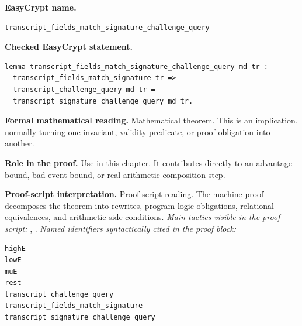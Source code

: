 \begin{formaltheorem}
\noindent\textbf{EasyCrypt name.}
\begin{lstlisting}[language=EasyCrypt,basicstyle=\ttfamily\scriptsize]
transcript_fields_match_signature_challenge_query
\end{lstlisting}
\noindent\textbf{Checked EasyCrypt statement.}
\begin{lstlisting}[language=EasyCrypt,basicstyle=\ttfamily\scriptsize]
lemma transcript_fields_match_signature_challenge_query md tr :
  transcript_fields_match_signature tr =>
  transcript_challenge_query md tr =
  transcript_signature_challenge_query md tr.
\end{lstlisting}
\noindent\textbf{Formal mathematical reading.}
Mathematical theorem. This is an implication, normally turning one invariant, validity predicate, or proof obligation into another.

\noindent\textbf{Role in the proof.}
Use in this chapter. It contributes directly to an advantage bound, bad-event bound, or real-arithmetic composition step.

\noindent\textbf{Proof-script interpretation.}
Proof-script reading. The machine proof decomposes the theorem into rewrites, program-logic obligations, relational equivalences, and arithmetic side conditions.
\emph{Main tactics visible in the proof script:} , .
\emph{Named identifiers syntactically cited in the proof block:}
\begin{lstlisting}[language=EasyCrypt,basicstyle=\ttfamily\scriptsize]
highE
lowE
muE
rest
transcript_challenge_query
transcript_fields_match_signature
transcript_signature_challenge_query
\end{lstlisting}

\end{formaltheorem}

